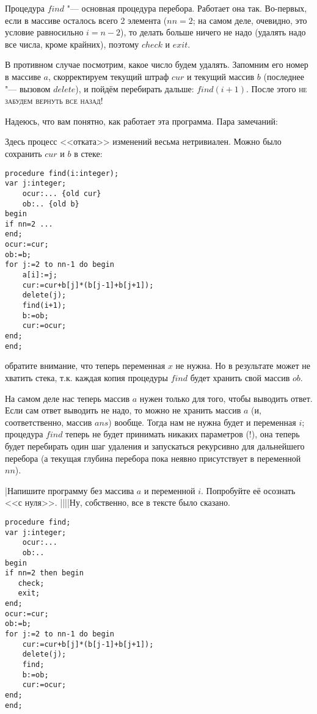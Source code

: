 Процедура $find$ "--- основная 
процедура перебора. Работает она так. Во-первых, если в массиве осталось всего 2 элемента ($nn=2$; на самом деле, 
очевидно, это условие равносильно $i=n-2$), то делать больше ничего не надо (удалять надо все 
числа, кроме крайних), поэтому $check$ и $exit$.

В противном случае посмотрим, какое число будем удалять. Запомним его номер в массиве $a$, 
скорректируем текущий штраф $cur$ и текущий массив $b$ (последнее "--- вызовом $delete$), и пойдём 
перебирать дальше: $find(i+1)$. После этого \textsc{не забудем вернуть все назад}!

Надеюсь, что вам понятно, как работает эта программа. Пара 
замечаний:
\begin{ulist}
\item Здесь процесс <<отката>> изменений весьма нетривиален. Можно было сохранить $cur$ и $b$ в стеке:
\begin{codesample}\begin{verbatim}
procedure find(i:integer);
var j:integer;
    ocur:... {old cur}
    ob:.. {old b}
begin
if nn=2 ...
end;
ocur:=cur;
ob:=b;
for j:=2 to nn-1 do begin
    a[i]:=j;
    cur:=cur+b[j]*(b[j-1]+b[j+1]);
    delete(j);
    find(i+1);
    b:=ob;
    cur:=ocur;
end;
end;
\end{verbatim}\end{codesample}
обратите внимание, что теперь переменная $x$ не нужна.
Но в результате может не хватить стека, т.к. каждая копия процедуры $find$ будет хранить свой массив $ob$.
\item На самом деле нас теперь массив $a$ нужен только для того, чтобы выводить ответ. Если сам 
ответ выводить не надо, то можно не хранить массив $a$ (и, соответственно, массив $ans$) вообще. 
Тогда нам не нужна будет и переменная $i$; процедура $find$ теперь не будет принимать никаких параметров (!), она теперь будет перебирать один шаг удаления и запускаться рекурсивно для дальнейшего перебора (а текущая глубина перебора пока неявно присутствует в переменной $nn$).
\end{ulist}

\task|Напишите программу без массива $a$ и переменной $i$. Попробуйте её 
осознать <<с нуля>>.
||||Ну, собственно, все в тексте было сказано.
\begin{codesample}\begin{verbatim}
procedure find;
var j:integer;
    ocur:...
    ob:..
begin
if nn=2 then begin
   check;
   exit;
end;
ocur:=cur;
ob:=b;
for j:=2 to nn-1 do begin
    cur:=cur+b[j]*(b[j-1]+b[j+1]);
    delete(j);
    find;
    b:=ob;
    cur:=ocur;
end;
end;
\end{verbatim}\end{codesample}

